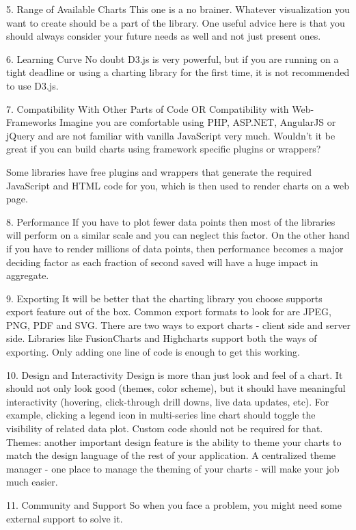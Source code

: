 5. Range of Available Charts
This one is a no brainer. Whatever visualization you want to create should be a part of the library. One useful advice here is that you should always consider your future needs as well and not just present ones.


6. Learning Curve
No doubt D3.js is very powerful, but if you are running on a tight deadline or using a charting library for the first time, it is not recommended to use D3.js.

7. Compatibility With Other Parts of Code OR Compatibility with Web-Frameworks
Imagine you are comfortable using PHP, ASP.NET, AngularJS or jQuery and are not familiar with vanilla JavaScript very much. Wouldn’t it be great if you can build charts using framework specific plugins or wrappers?

Some libraries have free plugins and wrappers that generate the required JavaScript and HTML code for you, which is then used to render charts on a web page.

8. Performance
If you have to plot fewer data points then most of the libraries will perform on a similar scale and you can neglect this factor. On the other hand if you have to render millions of data points, then performance becomes a major deciding factor as each fraction of second saved will have a huge impact in aggregate.

9. Exporting
It will be better that the charting library you choose supports export feature out of the box. Common export formats to look for are JPEG, PNG, PDF and SVG. There are two ways to export charts - client side and server side. Libraries like FusionCharts and Highcharts support both the ways of exporting. Only adding one line of code is enough to get this working.

10. Design and Interactivity
Design is more than just look and feel of a chart. It should not only look good (themes, color scheme), but it should have meaningful interactivity (hovering, click-through drill downs, live data updates, etc). For example, clicking a legend icon in multi-series line chart should toggle the visibility of related data plot. Custom code should not be required for that. Themes: another important design feature is the ability to theme your charts to match the design language of the rest of your application. A centralized theme manager - one place to manage the theming of your charts - will make your job much easier.


11. Community and Support
So when you face a problem, you might need some external support to solve it.

